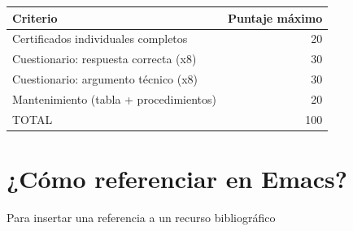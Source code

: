 \documentclass{article}
\begin{document}
\begin{center}
\begin{tabular}{lr}
Criterio & Puntaje máximo\\[0pt]
\hline
Certificados individuales completos & 20\\[0pt]
Cuestionario: respuesta correcta (x8) & 30\\[0pt]
Cuestionario: argumento técnico (x8) & 30\\[0pt]
Mantenimiento (tabla + procedimientos) & 20\\[0pt]
TOTAL & 100\\[0pt]
\end{tabular}
\end{center}

\section{¿Cómo referenciar en Emacs?}
\label{sec:orgdad5b46}
Para insertar una referencia a un recurso bibliográfico
\end{document}
